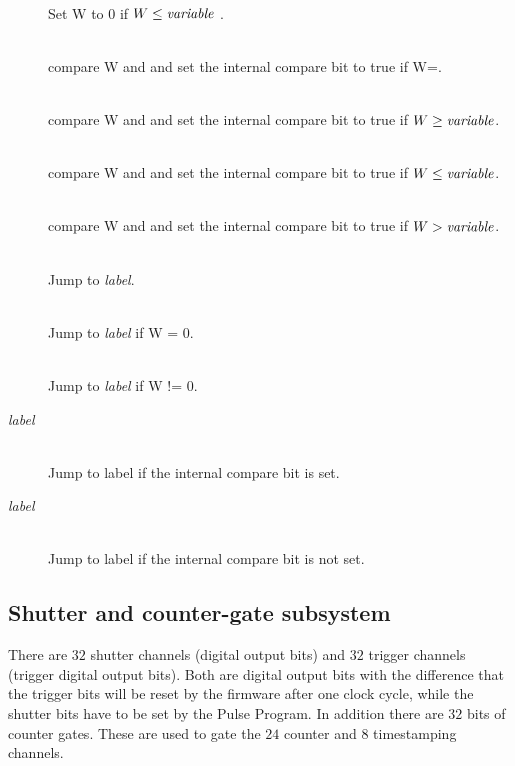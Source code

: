 \documentclass[11pt]{scrartcl}
\begin{document}
\begin{addmargin}{1cm}
\begin{description}
\item[ ]  \hfill\\  
Set W to 0 if $W \le \text{{\it variable}}$ .

\item[ ]  \hfill\\  
compare W and  and set the internal compare bit to true if W=.

\item[ ]\hfill\\  
compare W and  and set the internal compare bit to true if $W \ge \text{\it variable}$.

\item[ ]\hfill\\  
compare W and  and set the internal compare bit to true if $W \le \text{\it variable}$.

\item[ ]\hfill\\  
compare W and  and set the internal compare bit to true if $W > \text{\it variable}$.

\item[ ] \hfill\\   
Jump to {\it label}.

\item[ ]  \hfill\\  
Jump to {\it label} if W = 0.

\item[ ] \hfill\\   
Jump to {\it label} if W != 0.

\item[ {\it label}] \hfill\\   
Jump to label if the internal compare bit is set.

\item[ {\it label}] \hfill\\   
Jump to label if the internal compare bit is not set.
\end{description}
\end{addmargin}

\subsection{Shutter and counter-gate subsystem}
There are $32$ shutter channels (digital output bits) and $32$ trigger channels (trigger digital output bits). Both are digital output bits with the difference that the trigger bits will be reset by the firmware after one clock cycle, while the shutter bits have to be set by the Pulse Program. In addition there are $32$ bits of counter gates. These are used to gate the $24$ counter and $8$ timestamping channels.
\end{document}
